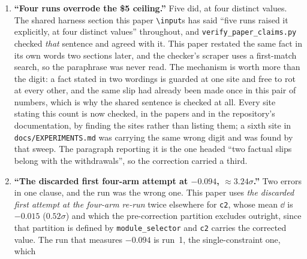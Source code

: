 \documentclass[11pt]{article}
\begin{document}
\begin{enumerate}
    so the instances the audit had added were $4$--$9$.
    \S\ref{sec:defect} always said six; the abstract, contribution~3 and the conclusion said seven,
    which would require a tenth row no table supports. The likely arithmetic is $9-2$: the abstract
    and the conclusion both introduce the original as \emph{two} ordinary wiring choices, which is
    true of its causes and leaves out the symptom the caption counts as defect~1. The count is now
    derived from the table's own row count and the range its caption names, at all four sites,
    which is why the table's later growth to eleven rows moved every site with it instead of
    stranding four numbers at nine. That is the difference between a count that is checked and a
    count that was once correct. The count is also restated in an abstract, the one place a
    reader checks first.
  \item \textbf{``Four runs overrode the \$5 ceiling.''} Five did, at four distinct values. The
    shared harness section this paper \texttt{\textbackslash input}s has said
    ``five runs raised it explicitly, at four distinct values'' throughout, and
    \texttt{verify\_paper\_claims.py} checked \emph{that} sentence and agreed with it. This paper
    restated the same fact in its own words two sections later, and the checker's scraper uses a
    first-match search, so the paraphrase was never read. The mechanism is worth more than the
    digit: a fact stated in two wordings is guarded at one site and free to rot at every other, and
    the same slip had already been made once in this pair of numbers, which is why the shared
    sentence is checked at all. Every site stating this count is now checked, in the papers and in
    the repository's documentation, by finding the sites rather than listing them; a sixth site in
    \texttt{docs/EXPERIMENTS.md} was carrying the same wrong digit and was found by that sweep.
    The paragraph reporting it is the one headed
    ``two factual slips belong with the withdrawals'', so the correction carried a third.
  \item \textbf{``The discarded first four-arm attempt at $-0.094$, ${\approx}3.24\sigma$.''}
    Two errors in one clause, and the run was the wrong one. This paper uses
    \emph{the discarded first attempt at the four-arm re-run} twice elsewhere for \texttt{c2}, whose
    mean $\dd$ is $-0.015$ ($0.52\sigma$) and which the pre-correction partition excludes outright,
    since that partition is defined by \texttt{module\_selector} and \texttt{c2} carries the
    corrected value. The run that measures $-0.094$ is run~1, the single-constraint one, which

\end{enumerate}
\end{document}
